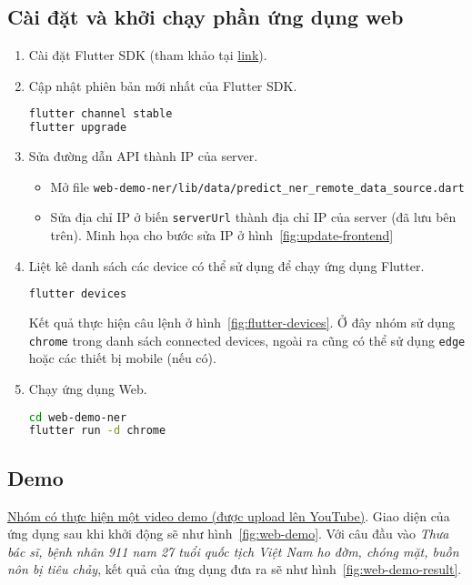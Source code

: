 \subsection{Cài đặt và khởi chạy phần ứng dụng web}
\begin{enumerate}
\item Cài đặt Flutter SDK (tham khảo tại \href{https://docs.flutter.dev/get-started/install}{link}).

\item Cập nhật phiên bản mới nhất của Flutter SDK.
\lstset{style=mystyle}
\begin{lstlisting}[language=bash]
flutter channel stable
flutter upgrade
\end{lstlisting}

\item Sửa đường dẫn API thành IP của server.
\begin{itemize}
\item Mở file \texttt{web-demo-ner/lib/data/predict\_ner\_remote\_data\_source.dart}
\item Sửa địa chỉ IP ở biến \texttt{serverUrl} thành địa chỉ IP của server (đã lưu bên trên). Minh họa cho bước sửa IP ở hình~\ref{fig:update-frontend}
\end{itemize}

\item Liệt kê danh sách các device có thể sử dụng để chạy ứng dụng Flutter.
\begin{lstlisting}[language=bash]
flutter devices
\end{lstlisting}
Kết quả thực hiện câu lệnh ở hình~\ref{fig:flutter-devices}. Ở đây nhóm sử dụng \texttt{chrome} trong danh sách connected devices, ngoài ra cũng có thể sử dụng \texttt{edge} hoặc các thiết bị mobile (nếu có).

\item Chạy ứng dụng Web.
\begin{lstlisting}[language=bash]
cd web-demo-ner
flutter run -d chrome
\end{lstlisting}
\end{enumerate}

\subsection{Demo}
\href{https://youtu.be/wpURv_DAAa4}{Nhóm có thực hiện một video demo (được upload lên YouTube)}. Giao diện của ứng dụng sau khi khởi động sẽ như hình~\ref{fig:web-demo}. Với câu đầu vào \textit{Thưa bác sĩ, bệnh nhân 911 nam 27 tuổi quốc tịch Việt Nam ho đờm, chóng mặt, buồn nôn
bị tiêu chảy}, kết quả của ứng dụng đưa ra sẽ như hình~\ref{fig:web-demo-result}. 